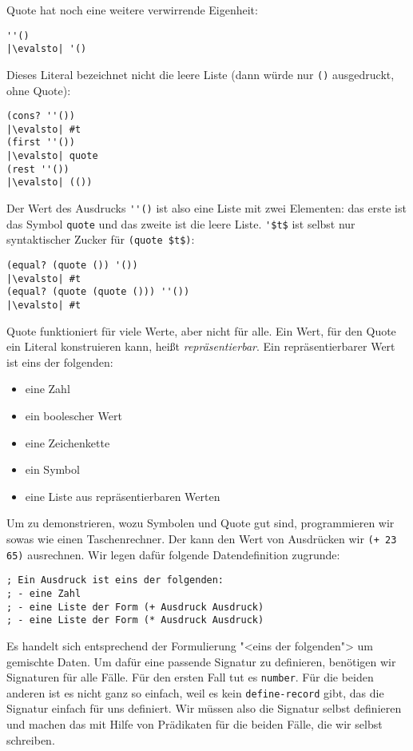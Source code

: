 Quote hat noch eine weitere verwirrende Eigenheit:
%
\begin{lstlisting}
''()
|\evalsto| '()
\end{lstlisting}
%
Dieses Literal bezeichnet nicht die leere Liste (dann würde nur
\lstinline{()} ausgedruckt, ohne Quote):
%
\begin{lstlisting}
(cons? ''())
|\evalsto| #t
(first ''())
|\evalsto| quote
(rest ''())
|\evalsto| (())
\end{lstlisting}
%
Der Wert des Ausdrucks \verb|''()| ist also eine Liste mit zwei
Elementen: das erste ist das Symbol \lstinline{quote} und das
zweite ist die leere Liste.  \lstinline{'$t$}
ist selbst nur syntaktischer Zucker für
\lstinline{(quote $t$)}:
%
\begin{lstlisting}
(equal? (quote ()) '())
|\evalsto| #t
(equal? (quote (quote ())) ''())
|\evalsto| #t
\end{lstlisting}
%
Quote funktioniert für viele Werte, aber
nicht für alle.  Ein Wert, für den Quote ein Literal konstruieren kann,
heißt \textit{repräsentierbar}.  Ein repräsentierbarer Wert ist
eins der folgenden:
%
\begin{itemize}
\item eine Zahl
\item ein boolescher Wert
\item eine Zeichenkette
\item ein Symbol
\item eine Liste aus repräsentierbaren Werten
\end{itemize}
%
Um zu demonstrieren, wozu Symbolen und Quote gut sind,
programmieren wir sowas wie einen Taschenrechner.
Der kann den Wert von Ausdrücken wir \lstinline{(+ 23 65)}
ausrechnen.  Wir legen dafür folgende Datendefinition zugrunde:
%
\begin{lstlisting}
; Ein Ausdruck ist eins der folgenden:
; - eine Zahl
; - eine Liste der Form (+ Ausdruck Ausdruck)
; - eine Liste der Form (* Ausdruck Ausdruck)
\end{lstlisting}
%
Es handelt sich entsprechend der Formulierung "<eins der folgenden">
um gemischte Daten.
Um dafür
eine passende Signatur zu definieren, benötigen wir Signaturen
für alle Fälle.  Für den ersten Fall tut es \lstinline{number}.  Für
die beiden anderen ist es nicht ganz so einfach, weil es kein
\lstinline{define-record} gibt, das die Signatur einfach für uns
definiert.  Wir müssen also die Signatur selbst definieren und machen
das mit Hilfe von Prädikaten für die beiden Fälle, die wir selbst schreiben.

